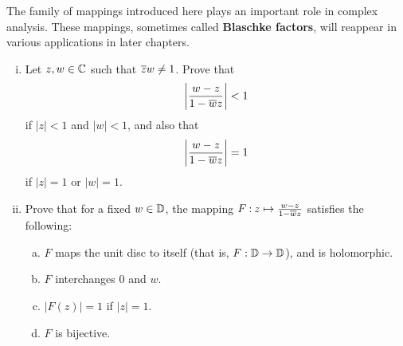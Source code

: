 \documentclass[12pt]{memoir}
\begin{document}
\begin{Ej}
    The family of mappings introduced here plays an important role in complex analysis. These mappings, sometimes called \textbf{Blaschke factors}, will reappear in various applications in later chapters.
    \begin{enumerate}[i)]
        \itemsep=-0.4em
        \item Let $z,w\in\mathbb{C}$ such that $\overline{z}w\neq 1$. Prove that 
        $$\left|\frac{w-z}{1-\overline w z}\right|<1$$
        if $|z|<1$ and $|w|<1$, and also that 
        $$\left|\frac{w-z}{1-\overline w z}\right|=1$$
        if $|z|=1$ or $|w|=1$. 
        \item Prove that for a fixed $w\in\mathbb{D}$, the mapping $F\mathbin{:}z\mapsto\frac{w-z}{1-\overline w z}$ satisfies the following:
        \begin{enumerate}[a)]
            \itemsep=-0.4em
            \item $F$ maps the unit disc to itself (that is, $F:\mathbb{D}\to\mathbb{D}$), and is holomorphic.
            \item $F$ interchanges $0$ and $w$. 
            \item $|F(z)|=1$ if $|z|=1$.
            \item $F$ is bijective. 
        \end{enumerate}
    \end{enumerate}
    \end{Ej}
\end{document}
